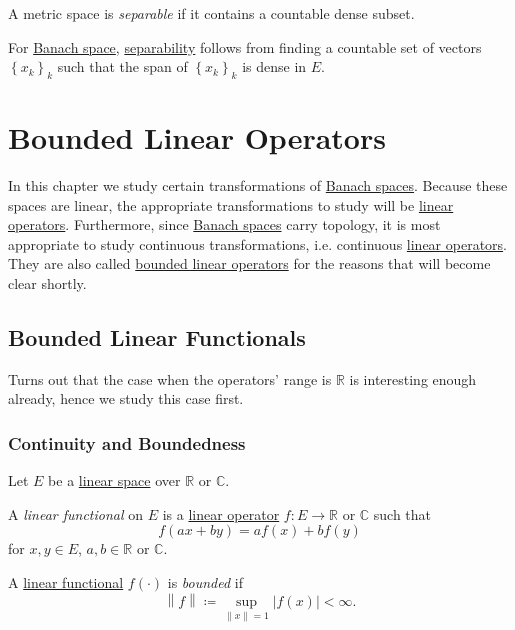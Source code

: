 \begin{definition}[Separable]\label{def:separable}
	A metric space is \emph{separable} if it contains a countable dense subset.
\end{definition}

\begin{remark}
	For \hyperref[def:Banach-space]{Banach space}, \hyperref[def:separable]{separability} follows from finding a countable set of vectors \(\left\{ x_{k}\right\}_k\) such that the span of \(\left\{ x_{k}\right\}_k\) is dense in \(E\).
\end{remark}

\chapter{Bounded Linear Operators}
In this chapter we study certain transformations of \hyperref[def:Banach-space]{Banach spaces}. Because these spaces are linear, the appropriate transformations to study will be \hyperref[def:linear-op]{linear operators}. Furthermore, since \hyperref[def:Banach-space]{Banach spaces} carry topology, it is most appropriate to study continuous transformations, i.e. continuous \hyperref[def:linear-op]{linear operators}. They are also called \hyperref[def:bounded-linear-op]{bounded linear operators} for the reasons that will become clear shortly.

\section{Bounded Linear Functionals}
Turns out that the case when the operators' range is \(\mathbb{R} \) is interesting enough already, hence we study this case first.
\subsection{Continuity and Boundedness}
\begin{definition*}
	Let \(E\) be a \hyperref[def:linear-vector-space]{linear space} over \(\mathbb{R} \) or \(\mathbb{C} \).
	\begin{definition}\label{def:linear-functional}
		A \emph{linear functional} on \(E\) is a \hyperref[def:linear-op]{linear operator} \(f\colon E\to \mathbb{R} \) or \(\mathbb{C} \) such that
		\[
			f(ax + by) = af(x) + bf(y)
		\]
		for \(x, y\in E\), \(a, b\in \mathbb{R} \) or \(\mathbb{C} \).
	\end{definition}
	\begin{definition}\label{def:bounded-linear-functional}
		A \hyperref[def:linear-functional]{linear functional} \(f(\cdot)\) is \emph{bounded} if
		\[
			\left\lVert f\right\rVert \coloneqq \sup _{\left\lVert x\right\rVert = 1}\left\vert f(x) \right\vert  < \infty.
		\]
	\end{definition}
\end{definition*}


